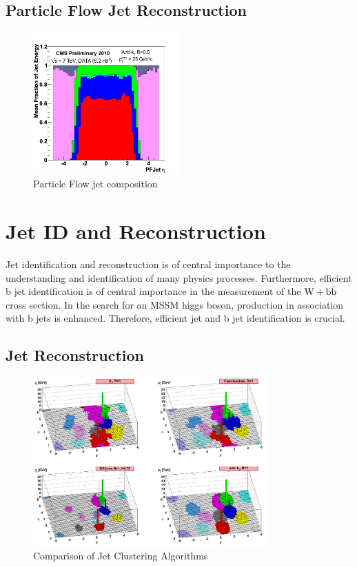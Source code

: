 \subsection{Particle Flow Jet Reconstruction}
\begin{figure}[ht]
  \centering
	\includegraphics[width=0.5\textwidth]{images/ParticleFlowJet.png}
  	\caption[PF Jet]
   	{Particle Flow jet composition}
	\label{fig:ParticleFlowJet}
\end{figure}

\section{Jet ID and Reconstruction}

Jet identification and reconstruction is of central importance to the understanding
and identification of many physics processes. Furthermore, efficient b jet 
identification is of central importance
in the measurement of the $\mathrm{W+\mathrm{b\bar{b}}}$ cross section.  
In the search for an MSSM higgs boson, production in association with b jets
is enhanced. Therefore, efficient jet and b jet identification is crucial.

\subsection{Jet Reconstruction}
\begin{figure}[ht]
  \centering
	\includegraphics[width=0.8\textwidth]{images/AntiKTAlgo.png}
  	\caption[Comparison of Jet Clustering Algorithms]
   	{Comparison of Jet Clustering Algorithms \cite{Cacciari:2008gp}}
	\label{fig:antiKt}
\end{figure}

